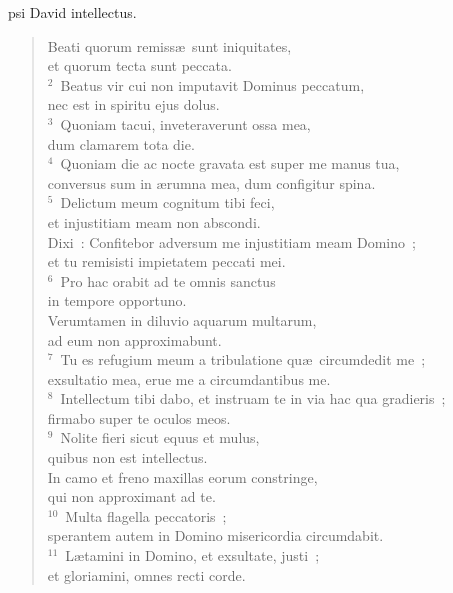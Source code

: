 \bchapter
{}psi David intellectus. \begin{flushleft}\begin{verse}\vspace{6pt}Beati quorum remiss\ae\ sunt iniquitates,\\ et quorum tecta sunt peccata.\\
${}^{2}$~Beatus vir cui non imputavit Dominus peccatum,\\ nec est in spiritu ejus dolus.\\
${}^{3}$~Quoniam tacui, inveteraverunt ossa mea,\\ dum clamarem tota die.\\
${}^{4}$~Quoniam die ac nocte gravata est super me manus tua,\\ conversus sum in \ae rumna mea, dum configitur spina.\\
${}^{5}$~Delictum meum cognitum tibi feci,\\ et injustitiam meam non abscondi.\\ Dixi~: Confitebor adversum me injustitiam meam Domino~;\\ et tu remisisti impietatem peccati mei.\\
${}^{6}$~Pro hac orabit ad te omnis sanctus\\ in tempore opportuno.\\ Verumtamen in diluvio aquarum multarum,\\ ad eum non approximabunt.\\
${}^{7}$~Tu es refugium meum a tribulatione qu\ae\ circumdedit me~;\\ exsultatio mea, erue me a circumdantibus me.\\
${}^{8}$~Intellectum tibi dabo, et instruam te in via hac qua gradieris~;\\ firmabo super te oculos meos.\\
${}^{9}$~Nolite fieri sicut equus et mulus,\\ quibus non est intellectus.\\ In camo et freno maxillas eorum constringe,\\ qui non approximant ad te.\\
${}^{10}$~Multa flagella peccatoris~;\\ sperantem autem in Domino misericordia circumdabit.\\
${}^{11}$~L\ae tamini in Domino, et exsultate, justi~;\\ et gloriamini, omnes recti corde.\end{verse}\end{flushleft}




